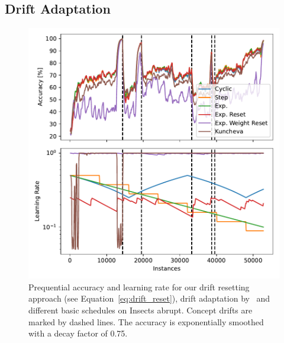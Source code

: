 \documentclass[letterpaper]{article} %
\begin{document}


\subsection{Drift Adaptation}

\begin{figure}[h]
	\centering
	\includegraphics[width=.47\textwidth]{figures/lr_norms_schedules_insects_abrupt.pdf}
	\caption{Prequential accuracy and learning rate for our drift resetting approach (see Equation~\eqref{eq:drift_reset}), drift adaptation by~\citet{kunchevaAdaptiveLearningRate2008} and different basic schedules on Insects abrupt. Concept drifts are marked by dashed lines. The accuracy is exponentially smoothed with a decay factor of 0.75.}
	\label{fig:prequential_schedulers_insects}
\end{figure}
\end{document}
